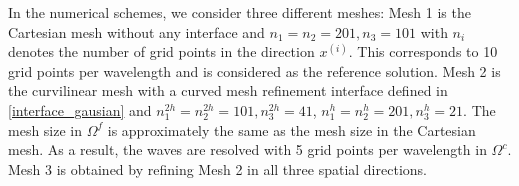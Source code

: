 In the numerical schemes, we consider three different meshes: Mesh 1 is the Cartesian mesh without any interface and $n_1 = n_2 = 201, n_3 = 101$ with $n_i$ denotes the number of grid points in the direction $x^{(i)}$. This corresponds to 10 grid points per wavelength and is considered as the  reference solution. Mesh 2 is the curvilinear mesh with a curved mesh refinement interface defined in \eqref{interface_gausian} and $n_1^{2h} = n_2^{2h} = 101, n_3^{2h} = 41$, $n_1^h = n_2^h = 201, n_3^h = 21$. The mesh size in $\Omega^f$ is approximately the same as the mesh size in the Cartesian mesh. As a result, the waves are resolved with 5 grid points per wavelength in $\Omega^c$. Mesh 3 is obtained by refining Mesh 2 in all three spatial directions. %

